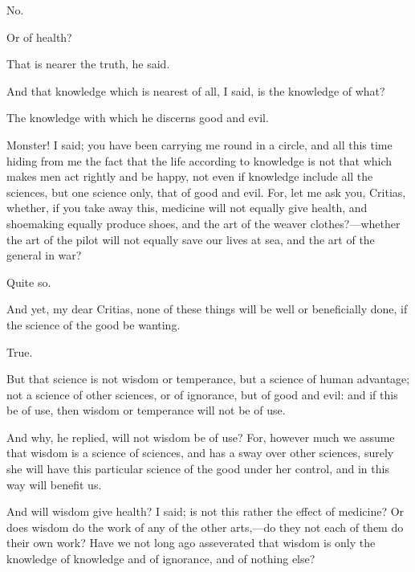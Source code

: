 \documentclass[11pt,letter]{article}
\begin{document}
\par  No.

\par  Or of health?

\par  That is nearer the truth, he said.

\par  And that knowledge which is nearest of all, I said, is the knowledge of what?

\par  The knowledge with which he discerns good and evil.

\par  Monster! I said; you have been carrying me round in a circle, and all this time hiding from me the fact that the life according to knowledge is not that which makes men act rightly and be happy, not even if knowledge include all the sciences, but one science only, that of good and evil. For, let me ask you, Critias, whether, if you take away this, medicine will not equally give health, and shoemaking equally produce shoes, and the art of the weaver clothes?—whether the art of the pilot will not equally save our lives at sea, and the art of the general in war?

\par  Quite so.

\par  And yet, my dear Critias, none of these things will be well or beneficially done, if the science of the good be wanting.

\par  True.

\par  But that science is not wisdom or temperance, but a science of human advantage; not a science of other sciences, or of ignorance, but of good and evil: and if this be of use, then wisdom or temperance will not be of use.

\par  And why, he replied, will not wisdom be of use? For, however much we assume that wisdom is a science of sciences, and has a sway over other sciences, surely she will have this particular science of the good under her control, and in this way will benefit us.

\par  And will wisdom give health? I said; is not this rather the effect of medicine? Or does wisdom do the work of any of the other arts,—do they not each of them do their own work? Have we not long ago asseverated that wisdom is only the knowledge of knowledge and of ignorance, and of nothing else?
\end{document}
